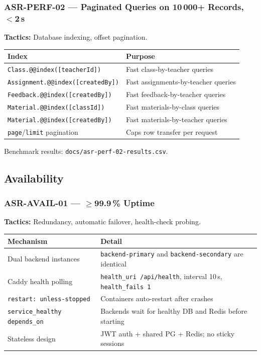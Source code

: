 \documentclass[12pt,a4paper]{article}
\begin{document}
\subsubsection{ASR-PERF-02 --- Paginated Queries on 10\,000+ Records, $<$2\,s}

\textbf{Tactics:} Database indexing, offset pagination.

\begin{tabularx}{\textwidth}{L{5cm} L{8.5cm}}
  \toprule
  \textbf{Index} & \textbf{Purpose} \\
  \midrule
  \texttt{Class.@@index([teacherId])} & Fast class-by-teacher queries \\
  \texttt{Assignment.@@index([createdBy])} & Fast assignments-by-teacher queries \\
  \texttt{Feedback.@@index([createdBy])} & Fast feedback-by-teacher queries \\
  \texttt{Material.@@index([classId])} & Fast materials-by-class queries \\
  \texttt{Material.@@index([createdBy])} & Fast materials-by-teacher queries \\
  \texttt{page}/\texttt{limit} pagination & Caps row transfer per request \\
  \bottomrule
\end{tabularx}

Benchmark results: \texttt{docs/asr-perf-02-results.csv}.

\subsection{Availability}

\subsubsection{ASR-AVAIL-01 --- $\geq$99.9\,\% Uptime}

\textbf{Tactics:} Redundancy, automatic failover, health-check probing.

\begin{tabularx}{\textwidth}{L{4.5cm} L{9cm}}
  \toprule
  \textbf{Mechanism} & \textbf{Detail} \\
  \midrule
  Dual backend instances & \texttt{backend-primary} and \texttt{backend-secondary} are identical \\
  Caddy health polling & \texttt{health\_uri /api/health}, interval 10\,s, \texttt{health\_fails 1} \\
  \texttt{restart: unless-stopped} & Containers auto-restart after crashes \\
  \texttt{service\_healthy} \texttt{depends\_on} & Backends wait for healthy DB and Redis before starting \\
  Stateless design & JWT auth + shared PG + Redis; no sticky sessions \\
  \bottomrule
\end{tabularx}
\end{document}
